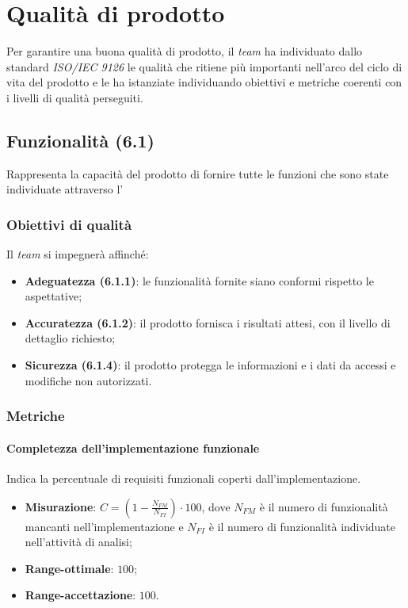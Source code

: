 \newpage
\section{Qualità di prodotto}
Per garantire una buona qualità di prodotto, il \textit{team} ha individuato dallo standard \textit{ISO/IEC 9126} le qualità che ritiene più importanti nell'arco del ciclo di vita del prodotto e le ha istanziate individuando obiettivi e metriche coerenti con i livelli di qualità perseguiti.

\subsection{Funzionalità (6.1)}
Rappresenta la capacità del prodotto di fornire tutte le funzioni che sono state individuate attraverso l'\textit{\AdR}
\subsubsection{Obiettivi di qualità}
Il \textit{team} si impegnerà affinché:
\begin{itemize}
\item \textbf{Adeguatezza (6.1.1)}: le funzionalità fornite siano conformi rispetto le aspettative;
\item \textbf{Accuratezza (6.1.2)}: il prodotto fornisca i risultati attesi, con il livello di dettaglio richiesto;
\item \textbf{Sicurezza (6.1.4)}: il prodotto protegga le informazioni e i dati da accessi e modifiche non autorizzati.
\end{itemize}
\subsubsection{Metriche}
\paragraph{Completezza dell'implementazione funzionale}
Indica la percentuale di requisiti funzionali coperti dall'implementazione.
\begin{itemize}
\item \textbf{Misurazione}: $C=(1-\frac{N_{FM}}{N_{FI}}) \cdot 100$, dove $N_{FM}$ è il numero di funzionalità mancanti nell'implementazione e $N_{FI}$ è il numero di funzionalità individuate nell'attività di analisi;
\item \textbf{Range-ottimale}: $100$;
\item \textbf{Range-accettazione}: $100$.
\end{itemize}
